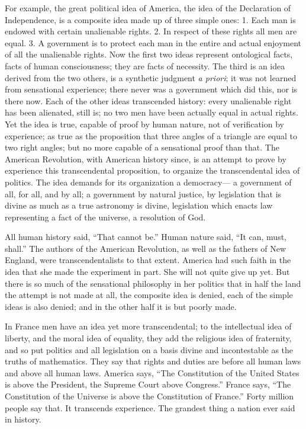 \documentclass[12pt]{article}
\begin{document}
For example, the great political idea of America, the idea of the Declaration of Independence, is a composite idea made up of three simple ones: 1. Each man is endowed with certain unalienable rights. 2. In respect of these rights all men are equal. 3. A government is to protect each man in the entire and actual enjoyment of all the unalienable rights. Now the first two ideas represent ontological facts, facts of human consciousness; they are facts of necessity. The third is an idea derived from the two others, is a synthetic judgment \emph{a priori}; it was not learned from sensational experience; there never was a government which did this, nor is there now. Each of the other ideas transcended history: every unalienable right has been alienated, still is; no two men have been actually equal in actual rights. Yet the idea is true, capable of proof by human nature, not of verification by experience; as true as the proposition that three angles of a triangle are equal to two right angles; but no more capable of a sensational proof than that. The American Revolution, with American history since, is an attempt to prove by experience this transcendental proposition, to organize the transcendental idea of politics. The idea demands for its organization a democracy--- a government of all, for all, and by all; a government by natural justice, by legislation that is divine as much as a true astronomy is divine, legislation which enacts law representing a fact of the universe, a resolution of God. 

All human history said, ``That cannot be.'' Human nature said, ``It can, must, shall.'' The authors of the American Revolution, as well as the fathers of New England, were transcendentalists to that extent. America had such faith in the idea that she made the experiment in part. She will not quite give up yet. But there is so much of the sensational philosophy in her politics that in half the land the attempt is not made at all, the composite idea is denied, each of the simple ideas is also denied; and in the other half it is but poorly made. 

In France men have an idea yet more transcendental; to the intellectual idea of liberty, and the moral idea of equality, they add the religious idea of fraternity, and so put politics and all legislation on a basis divine and incontestable as the truths of mathematics. They say that rights and duties are before all human laws and above all human laws. America says, ``The Constitution of the United States is above the President, the Supreme Court above Congress.'' France says, ``The Constitution of the Universe is above the Constitution of France.'' Forty million people say that. It transcends experience. The grandest thing a nation ever said in history. 
\end{document}
